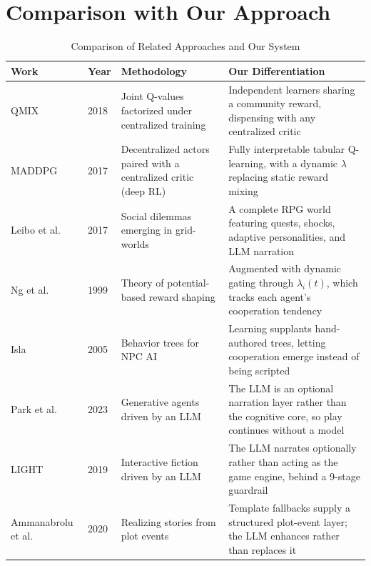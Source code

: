 \documentclass[12pt, a4paper, oneside]{report}
\begin{document}
\section{Comparison with Our Approach}
\label{sec:lit-comparison}

\begin{table}[H]
\centering
\caption{Comparison of Related Approaches and Our System}
\label{tab:lit-comparison}
\small
\begin{tabularx}{\textwidth}{|l|l|X|X|}
\hline
\textbf{Work} & \textbf{Year} & \textbf{Methodology} & \textbf{Our Differentiation} \\
\hline
QMIX~\cite{rashid2018qmix} & 2018 & Joint Q-values factorized under centralized training & Independent learners sharing a community reward, dispensing with any centralized critic \\
\hline
MADDPG~\cite{lowe2017maddpg} & 2017 & Decentralized actors paired with a centralized critic (deep RL) & Fully interpretable tabular Q-learning, with a dynamic $\lambda$ replacing static reward mixing \\
\hline
Leibo et al.~\cite{leibo2017multi} & 2017 & Social dilemmas emerging in grid-worlds & A complete RPG world featuring quests, shocks, adaptive personalities, and LLM narration \\
\hline
Ng et al.~\cite{ng1999rewardshaping} & 1999 & Theory of potential-based reward shaping & Augmented with dynamic gating through $\lambda_i(t)$, which tracks each agent's cooperation tendency \\
\hline
Isla~\cite{isla2005bt} & 2005 & Behavior trees for NPC AI & Learning supplants hand-authored trees, letting cooperation emerge instead of being scripted \\
\hline
Park et al.~\cite{park2023generative} & 2023 & Generative agents driven by an LLM & The LLM is an optional narration layer rather than the cognitive core, so play continues without a model \\
\hline
LIGHT~\cite{urbanek2019light} & 2019 & Interactive fiction driven by an LLM & The LLM narrates optionally rather than acting as the game engine, behind a 9-stage guardrail \\
\hline
Ammanabrolu et al.~\cite{ammanabrolu2020story} & 2020 & Realizing stories from plot events & Template fallbacks supply a structured plot-event layer; the LLM enhances rather than replaces it \\
\hline
\end{tabularx}
\end{table}
\end{document}
